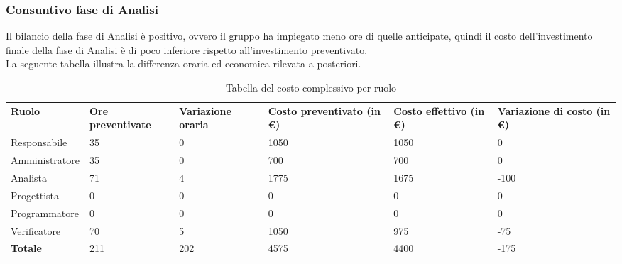 \subsubsection{Consuntivo fase di Analisi}
Il bilancio della fase di Analisi è positivo, ovvero il gruppo ha impiegato meno ore di quelle anticipate, quindi il costo dell'investimento finale della fase di Analisi è di poco inferiore rispetto all'investimento preventivato.\\
La seguente tabella illustra la differenza oraria ed economica rilevata a posteriori.
{
\renewcommand{\arraystretch}{2}
\begin{longtable}[h]{ C{2.5cm} C{2cm} C{1.8cm} C{2.2cm} C{1.5cm} C{2.3cm}}
\caption{Tabella del costo complessivo per ruolo}\\
\rowcolor{\primaryColor}

\textcolor{\secondaryColor}{\textbf{Ruolo}} & 
\textcolor{\secondaryColor}{\textbf{Ore preventivate}} & 
\textcolor{\secondaryColor}{\textbf{Variazione oraria}} & 
\textcolor{\secondaryColor}{\textbf{Costo preventivato (in \euro{})}} & 
\textcolor{\secondaryColor}{\textbf{Costo effettivo (in \euro{})}} & 
\textcolor{\secondaryColor}{\textbf{Variazione di costo (in \euro{})}}\\	
	
Responsabile    &  35 & 0 & 1050 & 1050 &  0 \\
Amministratore  &  35 & 0 & 700 & 700 & 0 \\
Analista        & 71 & 4 & 1775 & 1675 & -100 \\
Progettista     &   0 &   0 &    0 &  0 & 0 \\
Programmatore   &   0 &   0 &    0 &  0 & 0 \\
Verificatore    &  70 &  5 & 1050 & 975 & -75 \\
\textbf{Totale} & 211 & 202 & 4575 & 4400 & -175 \\	

\end{longtable}
}

